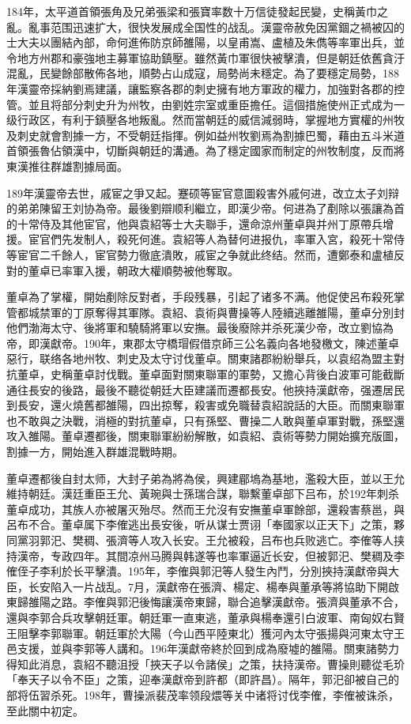184年，太平道首領張角及兄弟張梁和張寶率数十万信徒發起民變，史稱黃巾之亂。亂事范围迅速扩大，很快发展成全国性的战乱。漢靈帝赦免因黨錮之禍被囚的士大夫以團結內部，命何進佈防京師雒陽，以皇甫嵩、盧植及朱儁等率軍出兵，並令地方州郡和豪強地主募軍協助鎮壓。雖然黃巾軍很快被擊潰，但是朝廷依舊貪汙混亂，民變餘部散佈各地，順勢占山成寇，局勢尚未穩定。為了要穩定局勢，188年漢靈帝採納劉焉建議，讓監察各郡的刺史擁有地方軍政的權力，加強對各郡的控管。並且将部分刺史升为州牧，由劉姓宗室或重臣擔任。這個措施使州正式成为一级行政区，有利于鎮壓各地叛亂。然而當朝廷的威信減弱時，掌握地方實權的州牧及刺史就會割據一方，不受朝廷指揮。例如益州牧劉焉為割據巴蜀，藉由五斗米道首領張魯佔領漢中，切斷與朝廷的溝通。為了穩定國家而制定的州牧制度，反而將東漢推往群雄割據局面。

189年漢靈帝去世，戚宦之爭又起。蹇硕等宦官意圖殺害外戚何进，改立太子刘辩的弟弟陳留王刘协為帝。最後劉辯顺利繼立，即漢少帝。何进為了剷除以張讓為首的十常侍及其他宦官，他與袁紹等士大夫聯手，還命涼州董卓與并州丁原帶兵增援。宦官們先发制人，殺死何進。袁紹等人為替何进报仇，率軍入宮，殺死十常侍等宦官二千餘人，宦官勢力徹底潰敗，戚宦之争就此终结。然而，遭鄭泰和盧植反對的董卓已率軍入援，朝政大權順勢被他奪取。

董卓為了掌權，開始剷除反對者，手段残暴，引起了诸多不满。他促使呂布殺死掌管都城禁軍的丁原奪得其軍隊。袁紹、袁術與曹操等人陸續逃離雒陽，董卓分別封他們渤海太守、後將軍和驍騎將軍以安撫。最後廢除并杀死漢少帝，改立劉協為帝，即漢獻帝。190年，東郡太守橋瑁假借京師三公名義向各地發檄文，陳述董卓惡行，联络各地州牧、刺史及太守讨伐董卓。關東諸郡紛紛舉兵，以袁绍為盟主對抗董卓，史稱董卓討伐戰。董卓面對關東聯軍的軍勢，又擔心背後白波軍可能截斷通往長安的後路，最後不聽從朝廷大臣建議而遷都長安。他挾持漢獻帝，强遷居民到長安，還火燒舊都雒陽，四出掠奪，殺害或免職替袁紹說話的大臣。而關東聯軍也不敢與之決戰，消極的對抗董卓，只有孫堅、曹操二人敢與董卓軍對戰，孫堅還攻入雒陽。董卓遷都後，關東聯軍紛紛解散，如袁紹、袁術等勢力開始擴充版圖，割據一方，開始進入群雄混戰時期。

董卓遷都後自封太师，大封子弟為將為侯，興建郿塢為基地，濫殺大臣，並以王允維持朝廷。漢廷重臣王允、黃琬與士孫瑞合謀，聯繫董卓部下吕布，於192年刺杀董卓成功，其族人亦被屠灭殆尽。然而王允沒有安撫董卓軍餘部，還殺害蔡邕，與呂布不合。董卓属下李傕逃出長安後，听从谋士贾诩「奉國家以正天下」之策，夥同黨羽郭汜、樊稠、張濟等人攻入长安。王允被殺，吕布也兵败逃亡。李傕等人挟持漢帝，专政四年。其間凉州马腾與韩遂等也率軍逼近长安，但被郭汜、樊稠及李傕侄子李利於长平擊潰。195年，李傕與郭汜等人發生內鬥，分別挾持漢獻帝與大臣，长安陷入一片战乱。7月，漢獻帝在張濟、楊定、楊奉與董承等將協助下開啟東歸雒陽之路。李傕與郭汜後悔讓漢帝東歸，聯合追擊漢獻帝。張濟與董承不合，還與李郭合兵攻擊朝廷軍。朝廷軍一直東逃，董承與楊奉還引白波軍、南匈奴右賢王阻擊李郭聯軍。朝廷軍於大陽（今山西平陸東北）獲河內太守張揚與河東太守王邑支援，並與李郭等人講和。196年漢獻帝終於回到成為廢墟的雒陽。關東諸勢力得知此消息，袁紹不聽沮授「挾天子以令諸侯」之策，扶持漢帝。曹操則聽從毛玠「奉天子以令不臣」之策，迎奉漢獻帝到許都（即許昌）。隔年，郭汜卻被自己的部将伍習杀死。198年，曹操派裴茂率领段煨等关中诸将讨伐李傕，李傕被诛杀，至此關中初定。

